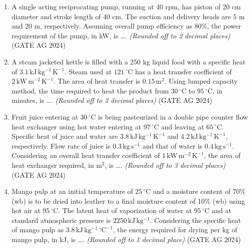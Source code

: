 \documentclass[journal]{IEEEtran}
\begin{document}
\begin{enumerate}
\medskip

\item 
A single acting reciprocating pump, running at 40 rpm, has piston of 20 cm diameter and stroke length of 40 cm. The suction and delivery heads are 5 m and 20 m, respectively. Assuming overall pump efficiency as 80\%, the power requirement of the pump, in kW, is \dots. \textit{(Rounded off to 2 decimal places)}
 \hfill(GATE AG 2024)\\

\medskip

\item
A steam jacketed kettle is filled with a 250 kg liquid food with a specific heat of $3.1\,\mathrm{kJ\,kg^{-1}\,K^{-1}}$. Steam used at $121\,^\circ\mathrm{C}$ has a heat transfer coefficient of $2\,\mathrm{kW\,m^{-2}\,K^{-1}}$. The area of heat transfer is $0.15\,\mathrm{m^2}$. Using lumped capacity method, the time required to heat the product from $30\,^\circ\mathrm{C}$ to $95\,^\circ\mathrm{C}$, in minutes, is \dots. \textit{(Rounded off to 2 decimal places)}
 \hfill(GATE AG 2024)\\

\medskip

\item
Fruit juice entering at $30\,^\circ\mathrm{C}$ is being pasteurized in a double pipe counter flow heat exchanger using hot water entering at $97\,^\circ\mathrm{C}$ and leaving at $65\,^\circ\mathrm{C}$. Specific heat of juice and water are $3.8\,\mathrm{kJ\,kg^{-1}\,K^{-1}}$ and $4.2\,\mathrm{kJ\,kg^{-1}\,K^{-1}}$, respectively. Flow rate of juice is $0.3\,\mathrm{kg\,s^{-1}}$ and that of water is $0.4\,\mathrm{kg\,s^{-1}}$. Considering an overall heat transfer coefficient of $1\,\mathrm{kW\,m^{-2}\,K^{-1}}$, the area of heat exchanger required, in m$^2$, is \dots. \textit{(Rounded off to 3 decimal places)}
 \hfill(GATE AG 2024)\\

\medskip

\item
Mango pulp at an initial temperature of $25\,^\circ\mathrm{C}$ and a moisture content of 70\% (wb) is to be dried into leather to a final moisture content of 10\% (wb) using hot air at $95\,^\circ\mathrm{C}$. The latent heat of vaporization of water at $95\,^\circ\mathrm{C}$ and at standard atmospheric pressure is $2250\,\mathrm{kJ\,kg^{-1}}$. Considering the specific heat of mango pulp as $3.8\,\mathrm{kJ\,kg^{-1}\,^\circ C^{-1}}$, the energy required for drying per kg of mango pulp, in kJ, is \dots. \textit{(Rounded off to 1 decimal place)}
 \hfill(GATE AG 2024)\\


\end{enumerate}
\end{document}

